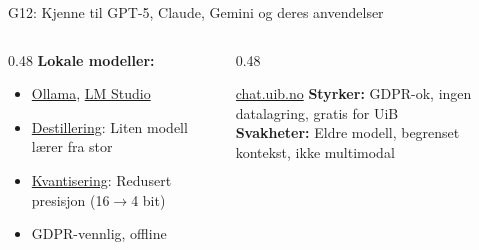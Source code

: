 \documentclass[aspectratio=169, 10pt]{beamer}
\begin{document}
\begin{frame}{G12: Kjenne til GPT-5, Claude, Gemini og deres anvendelser}
    \vspace{0.1cm}
    \begin{columns}[T]
        \begin{column}{0.48\textwidth}
            \textbf{Lokale modeller:}
            \scriptsize
            \begin{itemize}
                \item \href{https://ollama.ai/}{Ollama}, \href{https://lmstudio.ai/}{LM Studio}
                \item \href{https://en.wikipedia.org/wiki/Knowledge_distillation}{Destillering}: Liten modell lærer fra stor
                \item \href{https://en.wikipedia.org/wiki/Quantization_(signal_processing)\#Neural_network_quantization}{Kvantisering}: Redusert presisjon (16$\rightarrow$4 bit)
                \item GDPR-vennlig, offline
            \end{itemize}
        \end{column}
        \begin{column}{0.48\textwidth}
            \begin{block}{\scriptsize \href{https://chat.uib.no/}{chat.uib.no}}
                \scriptsize
                \textbf{Styrker:} GDPR-ok, ingen datalagring, gratis for UiB\\
                \textbf{Svakheter:} Eldre modell, begrenset kontekst, ikke multimodal
            \end{block}
        \end{column}
    \end{columns}
\end{frame}
\end{document}
